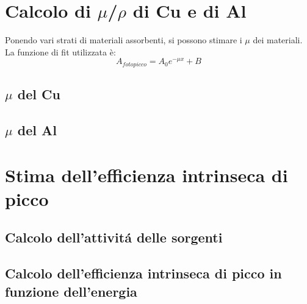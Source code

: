 \documentclass[a4paper]{article}
\begin{document}
\section{Calcolo di $\mu$/$\rho$ di Cu e di Al}
Ponendo vari strati di materiali assorbenti, si possono stimare i $\mu$ dei materiali. La funzione di fit utilizzata è:
\begin{equation}
A_{fotopicco}=A_{0}e^{-\mu x} + B
\end{equation}
\subsection{$\mu$ del Cu}
\subsection{$\mu$ del Al}



\section{Stima dell'efficienza intrinseca di picco}
\subsection{Calcolo dell'attivit\'a delle sorgenti}
\subsection{Calcolo dell'efficienza intrinseca di picco in funzione dell'energia}
\end{document}
